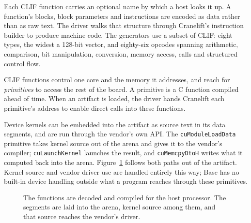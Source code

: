\documentclass[11pt]{article}
\begin{document}
Each CLIF function carries an optional name by which a host looks it up. A
function's blocks, block parameters and instructions are
encoded as data rather than as raw text. The driver walks that structure through
Cranelift's instruction builder to produce machine code. The generators use a
subset of CLIF: eight types, the widest a 128-bit vector, and
eighty-six opcodes spanning arithmetic, comparison, bit manipulation,
conversion, memory access, calls and structured control flow.

CLIF functions control one core and the memory it addresses, and reach for
\emph{primitives} to access the rest of the board. A primitive is a C
function compiled ahead of time. When an artifact is loaded, the driver hands
Cranelift each primitive's address to enable direct calls into these functions.

Device kernels can be embedded into the artifact as source text in its data
segments, and are run through the vendor's own API. The
\texttt{cuModuleLoadData} primitive takes kernel source out of the arena
and gives it to the vendor's compiler; \texttt{cuLaunchKernel} launches the
result, and \texttt{cuMemcpyDtoH} writes what it computed back into
the arena. Figure~\ref{fig:lowering} follows both paths out of the artifact.
Kernel source and vendor driver use are handled entirely this way; Base has no
built-in device handling outside what a program reaches through these
primitives.

\begin{figure}[tb]
\centering
{}
\caption{The functions are decoded and compiled for the host processor. The
segments are laid into the arena, kernel source among them, and that source
reaches the vendor's driver.}
\label{fig:lowering}
\end{figure}
\end{document}
